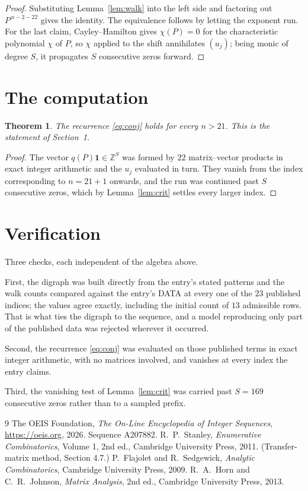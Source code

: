 \documentclass[11pt,a4paper]{article}
\theoremstyle{plain}
\newtheorem{theorem}{Theorem}
\theoremstyle{definition}
\begin{document}
\begin{proof}
Substituting Lemma~\ref{lem:walk} into the left side and factoring out
$P^{\,n-2-22}$ gives the identity. The equivalence follows by letting the exponent
run. For the last claim, Cayley--Hamilton gives $\chi(P)=0$ for the characteristic
polynomial $\chi$ of $P$, so $\chi$ applied to the shift annihilates $(u_j)$; being monic of
degree $S$, it propagates $S$ consecutive zeros forward.
\end{proof}

\section{The computation}

\begin{theorem}
The recurrence \eqref{eq:conj} holds for every $n>21$. This is the statement of
Section~1.
\end{theorem}

\begin{proof}
The vector $q(P)\mathbf{1}\in\mathbb{Z}^{S}$ was formed by $22$ matrix--vector
products in exact integer arithmetic and the $u_j$ evaluated in turn. They vanish from the
index corresponding to $n=21+1$ onwards, and the run was continued past $S$ consecutive
zeros, which by Lemma~\ref{lem:crit} settles every larger index.
\end{proof}

\section{Verification}

Three checks, each independent of the algebra above.

First, the digraph was built directly from the entry's stated patterns and the walk counts
compared against the entry's DATA at every one of the $23$ published indices; the
values agree exactly, including the initial count of $13$ admissible rows. That is
what ties the digraph to the sequence, and a model reproducing only part of the published
data was rejected wherever it occurred.

Second, the recurrence \eqref{eq:conj} was evaluated on those published terms in exact
integer arithmetic, with no matrices involved, and vanishes at every index the entry claims.

Third, the vanishing test of Lemma~\ref{lem:crit} was carried past $S=169$ consecutive
zeros rather than to a sampled prefix.

\begin{thebibliography}{9}
 The OEIS Foundation, \emph{The On-Line Encyclopedia of Integer
Sequences}, \url{https://oeis.org}, 2026. Sequence A207882.
 R.~P.~Stanley, \emph{Enumerative Combinatorics}, Volume 1, 2nd ed.,
Cambridge University Press, 2011. (Transfer-matrix method, Section 4.7.)
 P.~Flajolet and R.~Sedgewick, \emph{Analytic Combinatorics}, Cambridge
University Press, 2009.
 R.~A.~Horn and C.~R.~Johnson, \emph{Matrix Analysis}, 2nd ed., Cambridge
University Press, 2013.
\end{thebibliography}
\end{document}
